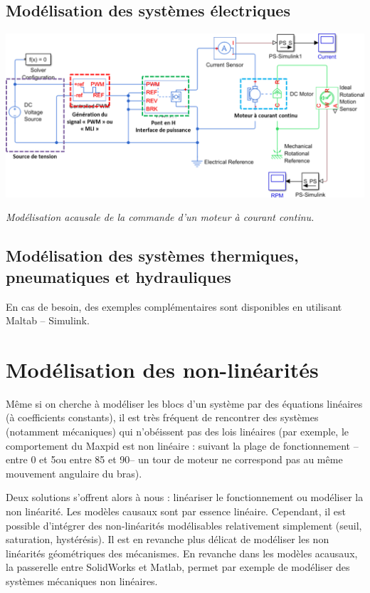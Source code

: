 \documentclass[10pt,fleqn]{article} %
\begin{document}
\subsection{Modélisation des systèmes électriques}

\begin{center}
\includegraphics[width=.6\linewidth]{images/MoteurCC}

\textit{Modélisation acausale de la commande d'un moteur à courant continu.}
\end{center}


\subsection{Modélisation des systèmes thermiques, pneumatiques et hydrauliques}
En cas de besoin, des exemples complémentaires sont disponibles en utilisant Maltab -- Simulink.


\section{Modélisation des non-linéarités}

Même si on cherche à modéliser les blocs d'un système par des équations linéaires (à coefficients constants), il est très fréquent de rencontrer des systèmes (notamment mécaniques) qui n'obéissent pas des lois linéaires (par exemple, le comportement du Maxpid est non linéaire : suivant la plage de fonctionnement -- entre 0 et 5\textdegree ou entre 85 et 90\textdegree -- un tour de moteur ne correspond pas au même mouvement angulaire du bras). 

Deux solutions s'offrent alors à nous : linéariser le fonctionnement ou modéliser la non linéarité. 
Les modèles causaux sont par essence linéaire. Cependant, il est possible d'intégrer des non-linéarités modélisables relativement simplement (seuil, saturation, hystérésis). Il est en revanche plus délicat de modéliser les non linéarités géométriques des mécanismes. 
En revanche dans les modèles acausaux, la passerelle entre SolidWorks et Matlab, permet par exemple de modéliser des systèmes mécaniques non linéaires.
\end{document}
